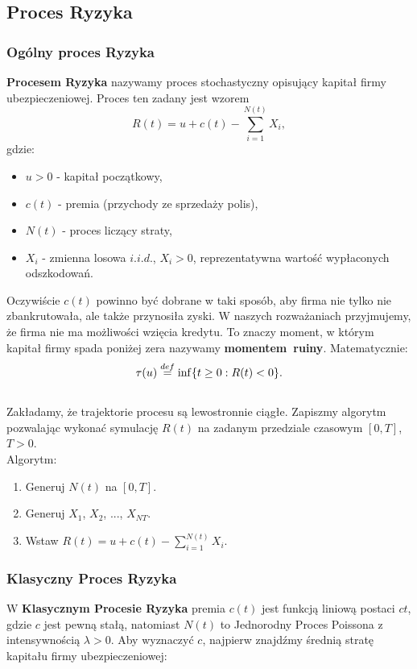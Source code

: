 \documentclass{article}
\theoremstyle{break}
\numberwithin{equation}{subsection}
\numberwithin{figure}{section}
\begin{document}
\subsection{Proces Ryzyka}
\subsubsection*{Ogólny proces Ryzyka}

\textbf{Procesem Ryzyka} nazywamy proces stochastyczny opisujący kapitał firmy ubezpieczeniowej. Proces ten zadany jest wzorem $$R(t) = u + c(t) - \sum_{i=1}^{N(t)}X_i,$$
gdzie:
\begin{itemize}
\item $u>0$ - kapitał początkowy,
\item $c(t)$ - premia (przychody ze sprzedaży polis),
\item $N(t)$ - proces liczący straty,
\item $X_i$ - zmienna losowa $i.i.d.$, $X_i>0$, reprezentatywna wartość wypłaconych odszkodowań.
\end{itemize}

Oczywiście $c(t)$ powinno być dobrane w taki sposób, aby firma nie tylko nie zbankrutowała, ale także przynosiła zyski. W naszych rozważaniach przyjmujemy, że firma nie ma możliwości wzięcia kredytu. To znaczy moment, w którym kapitał firmy spada poniżej zera nazywamy \textbf{momentem~ruiny}.
Matematycznie: $$\tau(u) \buildrel def \over = \inf\{t\ge 0: R(t) < 0\}. $$\\
Zakładamy, że trajektorie procesu są lewostronnie ciągłe.
Zapiszmy algorytm pozwalając wykonać symulację $R(t)$ na zadanym przedziale czasowym $[0, T]$, $T>0$.\\
Algorytm:
\begin{enumerate}
\item Generuj $N(t)$ na $[0, T]$.
\item Generuj $X_1$, $X_2$, ..., $X_{N{T}}$.
\item Wstaw $R(t) = u + c(t) - \sum_{i=1}^{N(t)}X_i$.
\end{enumerate}
\subsubsection*{Klasyczny Proces Ryzyka}
W \textbf{Klasycznym Procesie Ryzyka} premia $c(t)$ jest funkcją liniową postaci $ct$, gdzie $c$ jest pewną stałą, natomiast $N(t)$ to Jednorodny Proces Poissona z intensywnością $\lambda > 0$. Aby wyznaczyć $c$, najpierw znajdźmy średnią stratę kapitału firmy ubezpieczeniowej:
\end{document}
